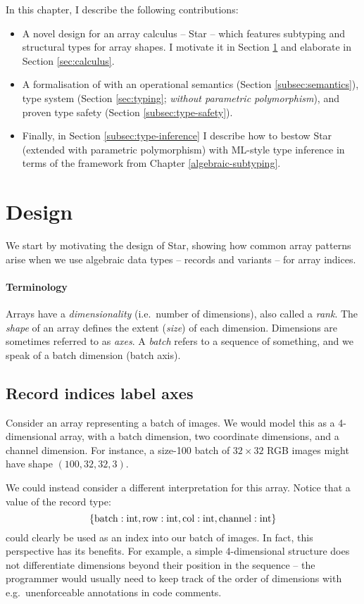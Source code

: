 In this chapter, I describe the following contributions: \begin{itemize}
    \item A novel design for an array calculus – Star – which features subtyping and structural types for array shapes. I motivate it in Section \ref{sec:design} and elaborate in Section \ref{sec:calculus}.
    \item A formalisation of with an operational semantics (Section \ref{subsec:semantics}), type system (Section \ref{sec:typing};  \emph{without parametric polymorphism}), and proven type safety (Section \ref{subsec:type-safety}).
    \item Finally, in Section \ref{subsec:type-inference} I describe how to bestow Star (extended with parametric polymorphism) with ML-style type inference in terms of the \inference{} framework from Chapter \ref{algebraic-subtyping}.
\end{itemize}

\section{Design}
\label{sec:design}

We start by motivating the design of Star, showing how common array patterns arise when we use algebraic data types -- records and variants -- for array indices.

\paragraph{Terminology} Arrays have a \emph{dimensionality} (i.e.\ number of dimensions), also called a \emph{rank}.
The \emph{shape} of an array defines the extent (\emph{size}) of
each dimension. Dimensions are sometimes referred to as \emph{axes}.
A \emph{batch} refers to a sequence of something, and we speak of a batch dimension (batch axis).

\subsection{Record indices label axes}

Consider an array representing a batch of images. We would model this as a 4-dimensional array, with a batch dimension, two coordinate dimensions, and a channel dimension. For instance, a size-100 batch of $32 \times 32$ RGB images might have shape $(100, 32, 32, 3)$.

We could instead consider a different interpretation for this array. Notice that a value of the record type:
$$ \srecordtype{ \mathrm{batch}: \sint, \mathrm{row}: \sint, \mathrm{col}: \sint, \mathrm{channel}: \sint } $$
could clearly be used as an index into our batch of images. In fact, this perspective has its benefits. For example, a simple 4-dimensional structure does not differentiate dimensions beyond their position in the sequence -- the programmer would usually need to keep track of the order of dimensions with e.g.\ unenforceable annotations in code comments. 


